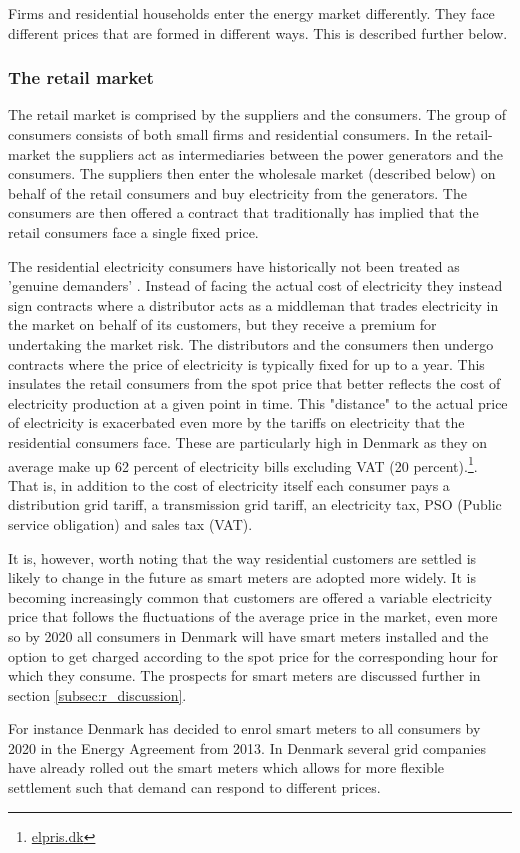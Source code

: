 Firms and residential households enter the energy market differently. They face different prices that are formed in different ways. This is described further below.

\subsubsection{The retail market}
\label{subsubsec: t_resmarket}
The retail market is comprised by the suppliers and the consumers. The group of consumers consists of both small firms and residential consumers. In the retail-market the suppliers act as intermediaries between the power generators and the consumers. The suppliers then enter the wholesale market (described below) on behalf of the retail consumers and buy electricity from the generators. The consumers are then offered a contract that traditionally has implied that the retail consumers face a single fixed price.
\bigskip \par
The residential electricity consumers have historically not been treated as 'genuine demanders' \citep{kirschen2003demand}. Instead of facing the actual cost of electricity they instead sign contracts where a distributor acts as a middleman that trades electricity in the market on behalf of its customers, but they receive a premium for undertaking the market risk. The distributors and the consumers then undergo contracts where the price of electricity is typically fixed for up to a year. This insulates the retail consumers from the spot price that better reflects the cost of electricity production at a given point in time. This "distance" to the actual price of electricity is exacerbated even more by the tariffs on electricity that the residential consumers face. These are particularly high in Denmark as they on average make up 62 percent of electricity bills excluding VAT (20 percent).\footnote{\href{https://elpris.dk}{elpris.dk}}. That is, in addition to the cost of electricity itself each consumer pays a distribution grid tariff, a transmission grid tariff, an electricity tax, PSO (Public service obligation) and sales tax (VAT).
\bigskip \par
It is, however, worth noting that the way residential customers are settled is likely to change in the future as smart meters are adopted more widely. It is becoming increasingly common that customers are offered a variable electricity price that follows the fluctuations of the average price in the market, even more so by 2020 all consumers in Denmark will have smart meters installed and the option to get charged according to the spot price for the corresponding hour for which they consume. The prospects for smart meters are discussed further in section \ref{subsec:r_discussion}.
\par
For instance Denmark has decided to enrol smart meters to all consumers by 2020 in the Energy Agreement from 2013. In Denmark several grid companies have already rolled out the smart meters which allows for more flexible settlement such that demand can respond to different prices.

